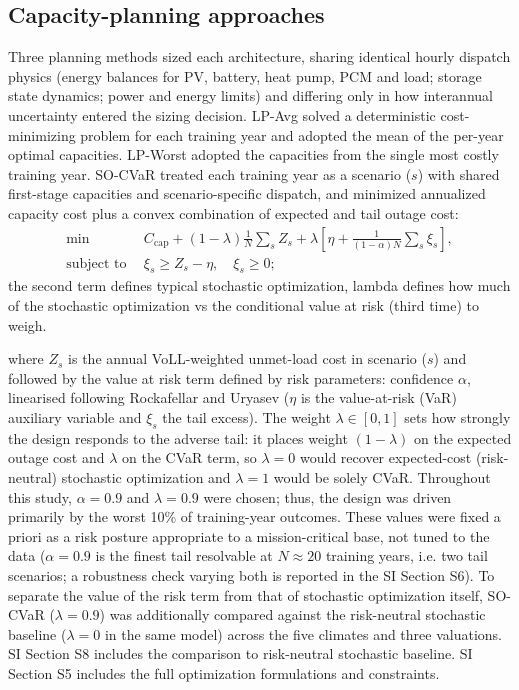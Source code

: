 \documentclass[
  journal=large,
  manuscript=article-type,
  year=2020,
  volume=37,
]{cup-journal}
\begin{document}
\subsection{Capacity-planning approaches}

Three planning methods sized each architecture, sharing identical hourly dispatch physics (energy balances for PV, battery, heat pump, PCM and load; storage state dynamics; power and energy limits) and differing only in how interannual uncertainty entered the sizing decision. LP-Avg solved a deterministic cost-minimizing problem for each training year and adopted the mean of the per-year optimal capacities. LP-Worst adopted the capacities from the single most costly training year. SO-CVaR treated each training year as a scenario ($s$) with shared first-stage capacities and scenario-specific dispatch, and minimized annualized capacity cost plus a convex combination of expected and tail outage cost:
\begin{equation*}
\begin{aligned}
\min\ \ & C_{\mathrm{cap}} + (1-\lambda)\tfrac{1}{N} \textstyle\sum_s Z_s + \lambda\left[\eta + \tfrac{1}{(1-\alpha)N}\textstyle\sum_s \xi_s\right], \\
\text{subject to}\ \ & \xi_s \geq Z_s - \eta,\quad \xi_s \geq 0;
\end{aligned}
\end{equation*}
the second term defines typical stochastic optimization, lambda defines how much of the stochastic optimization vs the conditional value at risk (third time) to weigh.

where $Z_s$ is the annual VoLL-weighted unmet-load cost in scenario ($s$) and followed by the value at risk term defined by risk parameters: confidence $\alpha$, linearised following Rockafellar and Uryasev \parencite{ref44} ($\eta$ is the value-at-risk (VaR) auxiliary variable and $\xi_s$ the tail excess). The weight $\lambda \in [0, 1]$ sets how strongly the design responds to the adverse tail: it places weight $(1-\lambda)$ on the expected outage cost and $\lambda$ on the CVaR term, so $\lambda = 0$ would recover expected-cost (risk-neutral) stochastic optimization and $\lambda = 1$ would be solely CVaR. Throughout this study, $\alpha = 0.9$ and $\lambda = 0.9$ were chosen; thus, the design was driven primarily by the worst 10\% of training-year outcomes. These values were fixed a priori as a risk posture appropriate to a mission-critical base, not tuned to the data ($\alpha = 0.9$ is the finest tail resolvable at $N \approx 20$ training years, i.e. two tail scenarios; a robustness check varying both is reported in the SI Section S6). To separate the value of the risk term from that of stochastic optimization itself, SO-CVaR ($\lambda = 0.9$) was additionally compared against the risk-neutral stochastic baseline ($\lambda = 0$ in the same model) across the five climates and three valuations. SI Section S8 includes the comparison to risk-neutral stochastic baseline. SI Section S5 includes the full optimization formulations and constraints.
\end{document}
